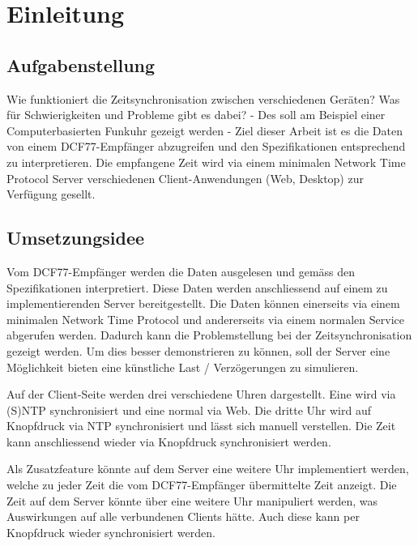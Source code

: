 
\chapter{Einleitung}



\section{Aufgabenstellung}

Wie funktioniert die Zeitsynchronisation zwischen verschiedenen Geräten? Was für Schwierigkeiten und Probleme gibt es dabei? - Des soll am Beispiel einer Computerbasierten Funkuhr gezeigt werden - Ziel dieser Arbeit ist es die Daten von einem DCF77-Empfänger abzugreifen und den Spezifikationen entsprechend zu interpretieren. Die empfangene Zeit wird via einem minimalen Network Time Protocol Server verschiedenen Client-Anwendungen (Web, Desktop) zur Verfügung gesellt.

\section{Umsetzungsidee}

Vom DCF77-Empfänger werden die Daten ausgelesen und gemäss den Spezifikationen interpretiert. Diese Daten werden anschliessend auf einem zu implementierenden Server bereitgestellt. Die Daten können einerseits via einem minimalen Network Time Protocol und andererseits via einem normalen Service abgerufen werden. Dadurch kann die Problemstellung bei der Zeitsynchronisation gezeigt werden. Um dies besser demonstrieren zu können, soll der Server eine Möglichkeit bieten eine künstliche Last / Verzögerungen zu simulieren.

Auf der Client-Seite werden drei verschiedene Uhren dargestellt. Eine wird via (S)NTP synchronisiert und eine normal via Web. Die dritte Uhr wird auf Knopfdruck via NTP synchronisiert und lässt sich manuell verstellen. Die Zeit kann anschliessend wieder via Knopfdruck synchronisiert werden.

Als Zusatzfeature könnte auf dem Server eine weitere Uhr implementiert werden, welche zu jeder Zeit die vom DCF77-Empfänger übermittelte Zeit anzeigt. Die Zeit auf dem Server könnte über eine weitere Uhr manipuliert werden, was Auswirkungen auf alle verbundenen Clients hätte. Auch diese kann per Knopfdruck wieder synchronisiert werden.

